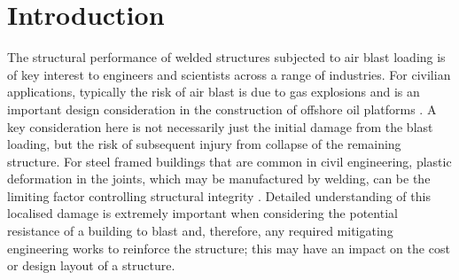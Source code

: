 \section{Introduction}
\label{Intro}
%
The structural performance of welded structures subjected to air blast loading is of key interest to engineers and scientists across a range of industries. For civilian applications, typically the risk of air blast is due to gas explosions and is an important design consideration in the construction of offshore oil platforms \cite{Langdon2005,Langdon2005a,Langdon2006}. %
A key consideration here is not necessarily just the initial damage from the blast loading, but the risk of subsequent injury from collapse of the remaining structure. For steel framed buildings that are common in civil engineering, plastic deformation in the joints, which may be manufactured by welding, can be the limiting factor controlling structural integrity \cite{Ngo2007}. Detailed understanding of this localised damage is extremely important when considering the potential resistance of a building to blast and, therefore, any required mitigating engineering works to reinforce the structure; this may have an impact on the cost or design layout of a structure.
